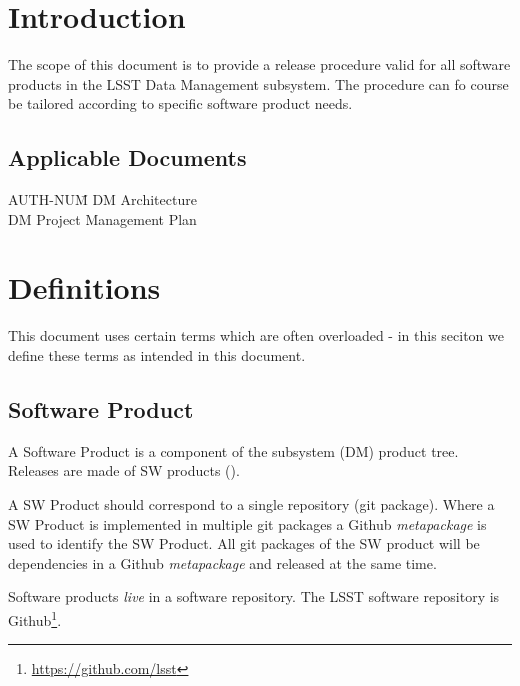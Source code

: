 \section{Introduction} \label{sec:intro}

The scope of this document is to provide a release procedure valid for all software products in the LSST Data Management subsystem. The procedure  can fo course be tailored according to specific software product needs.

\subsection{Applicable Documents}

\begin{tabbing}
AUTH-NUM\= \kill
{} \>     DM Architecture\\
 \>     DM Project Management Plan   \\
\end{tabbing}


\newpage
\section{Definitions} \label{sec:definitions}

This document uses certain terms which are often overloaded -  in this seciton we define these terms  as intended in this document.


\subsection{Software Product} \label{sec:swprod}

A Software Product is a component of the subsystem (DM) product tree.
Releases are made of  SW products ().

A SW Product should correspond to a single repository (git package).
Where a SW Product is implemented in multiple git packages
a Github \textit{metapackage} is used to identify the SW Product.
All git packages of the SW product will be dependencies in a Github \textit{metapackage} and released at the same time.

Software products \textit{live} in a software repository. The LSST software repository is Github\footnote{\url{https://github.com/lsst}}.

